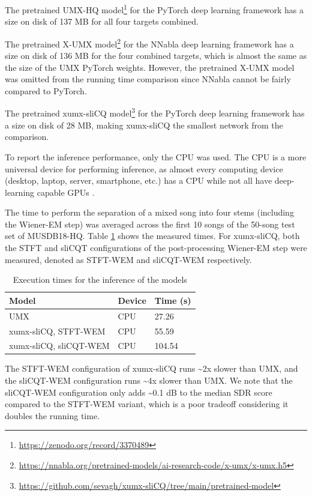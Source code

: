 \documentclass[report.tex]{subfiles}
\begin{document}
The pretrained UMX-HQ model\footnote{\url{https://zenodo.org/record/3370489}} for the PyTorch deep learning framework has a size on disk of 137 MB for all four targets combined.

The pretrained X-UMX model\footnote{\url{https://nnabla.org/pretrained-models/ai-research-code/x-umx/x-umx.h5}} for the NNabla deep learning framework has a size on disk of 136 MB for the four combined targets, which is almost the same as the size of the UMX PyTorch weights. However, the pretrained X-UMX model was omitted from the running time comparison since NNabla cannot be fairly compared to PyTorch.

The pretrained xumx-sliCQ model\footnote{\url{https://github.com/sevagh/xumx-sliCQ/tree/main/pretrained-model}} for the PyTorch deep learning framework has a size on disk of 28 MB, making xumx-sliCQ the smallest network from the comparison.

To report the inference performance, only the CPU was used. The CPU is a more universal device for performing inference, as almost every computing device (desktop, laptop, server, smartphone, etc.) has a CPU while not all have deep-learning capable GPUs \parencite{deepcpuinf, deepcpuinf2}.

The time to perform the separation of a mixed song into four stems (including the Wiener-EM step) was averaged across the first 10 songs of the 50-song test set of MUSDB18-HQ. Table \ref{table:infperf} shows the measured times. For xumx-sliCQ, both the STFT and sliCQT configurations of the post-processing Wiener-EM step were measured, denoted as STFT-WEM and sliCQT-WEM respectively.

\begin{table}[ht]
	\centering
	\caption{Execution times for the inference of the models}
	\label{table:infperf}
	\begin{tabular}{ |l|l|l| }
	 \hline
		Model & Device & Time (s) \\
	 \hline
	 \hline
		UMX & CPU & 27.26  \\
	 \hline
		xumx-sliCQ, STFT-WEM & CPU & 55.59  \\
	 \hline
		xumx-sliCQ, sliCQT-WEM & CPU & 104.54  \\
	 \hline
\end{tabular}
\end{table}

The STFT-WEM configuration of xumx-sliCQ runs \textasciitilde2x slower than UMX, and the sliCQT-WEM configuration runs \textasciitilde4x slower than UMX. We note that the sliCQT-WEM configuration only adds \textasciitilde0.1 dB to the median SDR score compared to the STFT-WEM variant, which is a poor tradeoff considering it doubles the running time.
\end{document}
